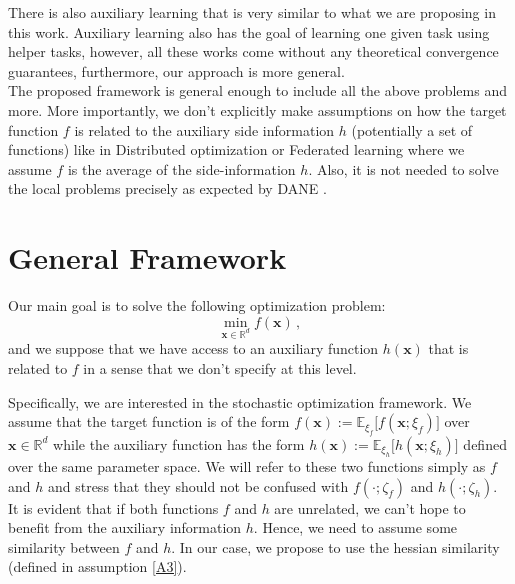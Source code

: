 \documentclass[10pt]{article} %
\theoremstyle{plain}
\theoremstyle{definition}
\theoremstyle{remark}
\def\vx{{\bm{x}}}
\newcommand{\E}{\mathbb{E}}
\newcommand{\R}{\mathbb{R}}
\begin{document}
There is also auxiliary learning \citep{AuxTMDL, AuxLinImplicit,AdaptTaskReweighting} that is very similar to what we are proposing in this work. Auxiliary learning also has the goal of learning one given task using helper tasks, however, all these works come without any theoretical convergence guarantees, furthermore, our approach is more general.\\
The proposed framework is general enough to include all the above problems and more. More importantly, we don't explicitly make assumptions on how the target function $f$ is related to the auxiliary side information $h$ (potentially a set of functions) like in Distributed optimization or Federated learning where we assume $f$ is the average of the side-information $h$. Also, it is not needed to solve the local problems precisely as expected by DANE \citep{DANE}. 
\section{General Framework}
Our main goal is to solve the following optimization problem: \begin{equation}
    \label{mainProblem} \min_{\vx\in \R^d} f(\vx)\, ,
\end{equation}
and we suppose that we have access to an auxiliary function $h(\vx)$ that is related to $f$ in a sense that we don't specify at this level.

Specifically, we are interested in the stochastic optimization framework. We assume that the target function is of the form $f(\vx):= \E_{\xi_f}\big[ f(\vx; \xi_f)\big]$ over $\vx\in\R^d$ while the auxiliary function has the form $h(\vx):= \E_{\xi_h}\big[ h(\vx; \xi_h)\big]$ defined over the same parameter space. We will refer to these two functions simply as $f$ and $h$ and stress that they should not be confused with $f(\cdot;\zeta_f)$ and $h(\cdot;\zeta_h)$.
It is evident that if both functions $f$ and $h$ are unrelated, we can't hope to benefit from the auxiliary information $h$. Hence, we need to assume some similarity between $f$ and $h$. In our case, we propose to use the hessian similarity (defined in assumption \ref{A3}). 
\end{document}
